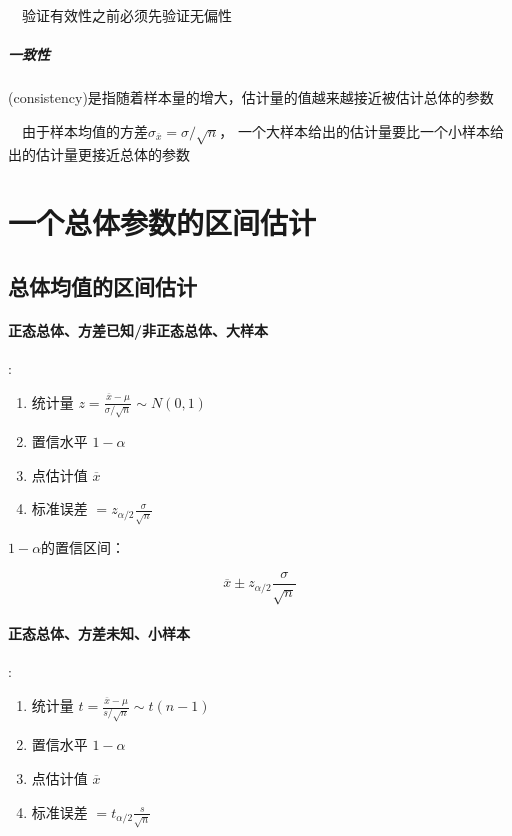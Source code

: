 \documentclass[UTF8,10pt]{book}
\begin{document}
                        {\kaishu $\quad$验证有效性之前必须先验证无偏性}


                \subparagraph{一致性}
                    (consistency)是指随着样本量的增大，估计量的值越来越接近被估计总体的参数

                    {\kaishu $\quad$由于样本均值的方差$\sigma_{\overline{x}} = \sigma / \sqrt{n}$，
                    一个大样本给出的估计量要比一个小样本给出的估计量更接近总体的参数}
    
        \section{一个总体参数的区间估计}

            \subsection{总体均值的区间估计}
                
                \paragraph{正态总体、方差已知/非正态总体、大样本}:                        

                    {\kaishu

                    \begin{enumerate}
                        \item 统计量 $ z = \frac{\overline{x}-\mu}{\sigma / \sqrt{n}} \sim N(0,1)$
                        \item 置信水平 $1-\alpha$
                        \item 点估计值 $\overline{x}$
                        \item 标准误差 $ = z_{\alpha / 2} \frac{\sigma}{\sqrt{n}} $
                    \end{enumerate}                                  
                    }

                    $1-\alpha$的置信区间：
                    
                        $$\overline{x} \pm z_{\alpha / 2} \frac{\sigma}{\sqrt{n}}$$
                        

                \paragraph{正态总体、方差未知、小样本}:

                    {\kaishu

                    \begin{enumerate}
                        \item 统计量 $ t = \frac{\overline{x}-\mu}{s / \sqrt{n}} \sim t(n-1)$
                        \item 置信水平 $1-\alpha$
                        \item 点估计值 $\overline{x}$
                        \item 标准误差 $ = t_{\alpha / 2} \frac{s}{\sqrt{n}} $
                    \end{enumerate}                                  
                    }
\end{document}
